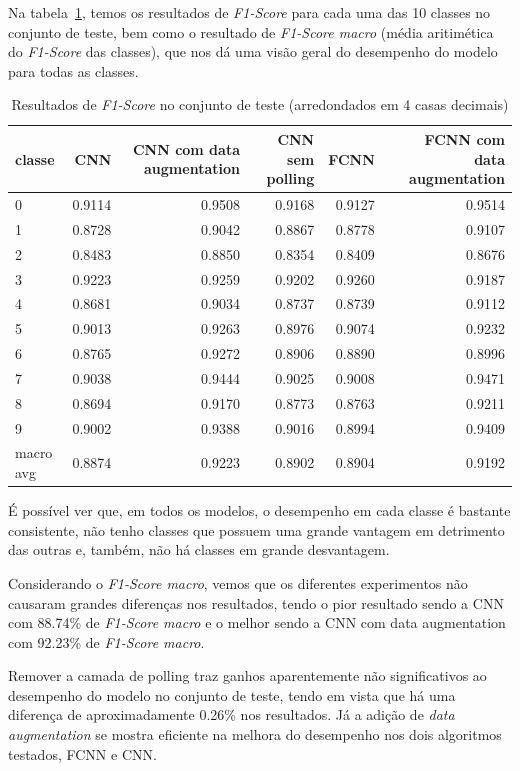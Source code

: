 \documentclass[12pt]{article}
\begin{document}
Na tabela~\ref{table:results_f1}, temos os resultados de \textit{F1-Score} para cada uma das 10 classes no conjunto de teste, bem como o resultado de \textit{F1-Score macro} (média aritimética do \textit{F1-Score} das classes), que nos dá uma visão geral do desempenho do modelo para todas as classes.

\begin{table}[H]\scriptsize\centering
\begin{tabular}{l|rrrrr}
\toprule
classe & CNN & CNN com data augmentation & CNN sem polling & FCNN & FCNN com data augmentation \\
\midrule
0 & 0.9114 & 0.9508 & 0.9168 & 0.9127 & 0.9514 \\
1 & 0.8728 & 0.9042 & 0.8867 & 0.8778 & 0.9107 \\
2 & 0.8483 & 0.8850 & 0.8354 & 0.8409 & 0.8676 \\
3 & 0.9223 & 0.9259 & 0.9202 & 0.9260 & 0.9187 \\
4 & 0.8681 & 0.9034 & 0.8737 & 0.8739 & 0.9112 \\
5 & 0.9013 & 0.9263 & 0.8976 & 0.9074 & 0.9232 \\
6 & 0.8765 & 0.9272 & 0.8906 & 0.8890 & 0.8996 \\
7 & 0.9038 & 0.9444 & 0.9025 & 0.9008 & 0.9471 \\
8 & 0.8694 & 0.9170 & 0.8773 & 0.8763 & 0.9211 \\
9 & 0.9002 & 0.9388 & 0.9016 & 0.8994 & 0.9409 \\
\midrule
macro avg & 0.8874 & 0.9223 & 0.8902 & 0.8904 & 0.9192 \\
\bottomrule
\end{tabular}

    
\caption{Resultados de \textit{F1-Score} no conjunto de teste (arredondados em 4 casas decimais)}
\label{table:results_f1}
\end{table}

É possível ver que, em todos os modelos, o desempenho em cada classe é bastante consistente, não tenho classes que possuem uma grande vantagem em detrimento das outras e, também, não há classes em grande desvantagem. 

Considerando o \textit{F1-Score macro}, vemos que os diferentes experimentos não causaram grandes diferenças nos resultados, tendo o pior resultado sendo a CNN com 88.74\% de \textit{F1-Score macro} e o melhor sendo a CNN com data augmentation com 92.23\% de \textit{F1-Score macro}.

Remover a camada de polling traz ganhos aparentemente não significativos ao desempenho do modelo no conjunto de teste, tendo em vista que há uma diferença de aproximadamente 0.26\% nos resultados. Já a adição de \textit{data augmentation} se mostra eficiente na melhora do desempenho nos dois algoritmos testados, FCNN e CNN. 
\end{document}
